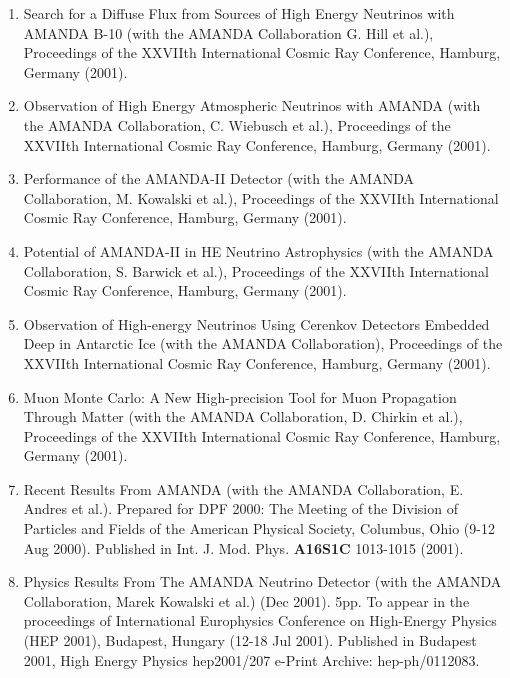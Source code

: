\begin{enumerate}
\item Search for a Diffuse Flux from Sources of High Energy Neutrinos
  with AMANDA B-10 (with the AMANDA Collaboration G. Hill et al.),
  Proceedings of the XXVIIth International Cosmic Ray Conference,
  Hamburg, Germany (2001).

\item Observation of High Energy Atmospheric Neutrinos with AMANDA
  (with the AMANDA Collaboration, C. Wiebusch et al.), Proceedings of
  the XXVIIth International Cosmic Ray Conference, Hamburg, Germany
  (2001).

\item Performance of the AMANDA-II Detector (with the AMANDA
  Collaboration, M. Kowalski et al.), Proceedings of the XXVIIth
  International Cosmic Ray Conference, Hamburg, Germany (2001).

\item Potential of AMANDA-II in HE Neutrino Astrophysics (with the
  AMANDA Collaboration, S. Barwick et al.), Proceedings of the XXVIIth
  International Cosmic Ray Conference, Hamburg, Germany (2001).

\item Observation of High-energy Neutrinos Using Cerenkov Detectors
  Embedded Deep in Antarctic Ice (with the AMANDA Collaboration),
  Proceedings of the XXVIIth International Cosmic Ray Conference,
  Hamburg, Germany (2001).

\item Muon Monte Carlo: A New High-precision Tool for Muon Propagation
  Through Matter (with the AMANDA Collaboration, D. Chirkin et al.),
  Proceedings of the XXVIIth International Cosmic Ray Conference,
  Hamburg, Germany (2001).

\item Recent Results From AMANDA (with the AMANDA Collaboration,
  E. Andres et al.).  Prepared for DPF 2000: The Meeting of the
  Division of Particles and Fields of the American Physical Society,
  Columbus, Ohio (9-12 Aug 2000).  Published in
  Int. J. Mod. Phys. {\bf A16S1C} 1013-1015 (2001).

\item Physics Results From The AMANDA Neutrino Detector (with the
  AMANDA Collaboration, Marek Kowalski et al.) (Dec 2001). 5pp.  To
  appear in the proceedings of International Europhysics Conference on
  High-Energy Physics (HEP 2001), Budapest, Hungary (12-18 Jul 2001).
  Published in Budapest 2001, High Energy Physics hep2001/207 e-Print
  Archive: hep-ph/0112083.


\end{enumerate}
